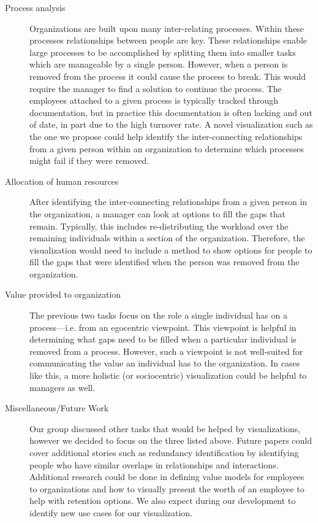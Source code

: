 \documentclass{soups}
\begin{document}
\begin{description}
\item [Process analysis] Organizations are built upon many inter-relating processes.  Within these processes relationships between people are key.  These relationships enable large processes to be accomplished by splitting them into smaller tasks which are manageable by a single person.  However, when a person is removed from the process it could cause the process to break.  This would require the manager to find a solution to continue the process.  The employees attached to a given process is typically tracked through documentation, but in practice this documentation is often lacking and out of date, in part due to the high turnover rate.  A novel visualization such as the one we propose could help identify the inter-connecting relationships from a given person within an organization to determine which processes might fail if they were removed.
  
\item [Allocation of human resources] After identifying the inter-connecting relationships from a given person in the organization, a manager can look at options to fill the gaps that remain.  Typically, this includes re-distributing the workload over the remaining individuals within a section of the organization.  Therefore, the visualization would need to include a method to show options for people to fill the gaps that were identified when the person was removed from the organization.
  
\item[Value provided to organization] The previous two tasks focus on the role a single individual has on a process---i.e. from an egocentric viewpoint. This viewpoint is helpful in determining what gaps need to be filled when a particular individual is removed from a process. However, such a viewpoint is not well-suited for communicating the value an individual has to the organization. In cases like this, a more holistic (or sociocentric) visualization could be helpful to managers as well. 
  
\item [Miscellaneous/Future Work]Our group discussed other tasks that would be helped by visualizations, however we decided to focus on the three listed above.  Future papers could cover additional stories such as redundancy identification by identifying people who have similar overlaps in relationships and interactions.  Additional research could be done in defining value models for employees to organizations and how to visually present the worth of an employee to help with retention options.  We also expect during our development to identify new use cases for our visualization.  
\end{description}
\end{document}
